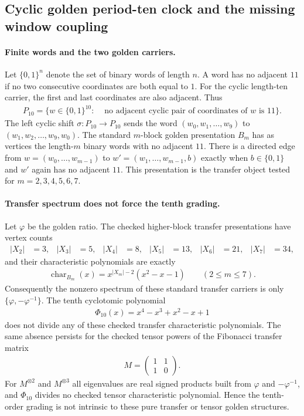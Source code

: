 
\subsection{Cyclic golden period-ten clock and the missing window coupling}
\label{sec:window6-cyclic-golden-10-clock-phi10-forward-coupling-needs-external}

\paragraph{Finite words and the two golden carriers.}
Let $\{0,1\}^n$ denote the set of binary words of length $n$. A word has no adjacent $11$ if no two consecutive coordinates are both equal to $1$. For the cyclic length-ten carrier, the first and last coordinates are also adjacent. Thus
$$
\begin{aligned}
P_{10}=\{w\in \{0,1\}^{10}:&\text{ no adjacent cyclic pair of coordinates of }w\text{ is }11\}.
\end{aligned}
$$
The left cyclic shift $\sigma:P_{10}\to P_{10}$ sends the word $(w_0,w_1,\ldots,w_9)$ to $(w_1,w_2,\ldots,w_9,w_0)$. The standard $m$-block golden presentation $B_m$ has as vertices the length-$m$ binary words with no adjacent $11$. There is a directed edge from $w=(w_0,\ldots,w_{m-1})$ to $w'=(w_1,\ldots,w_{m-1},b)$ exactly when $b\in\{0,1\}$ and $w'$ again has no adjacent $11$. This presentation is the transfer object tested for $m=2,3,4,5,6,7$.

\paragraph{Transfer spectrum does not force the tenth grading.}
Let $\varphi$ be the golden ratio. The checked higher-block transfer presentations have vertex counts
$$
\begin{aligned}
|X_2|&=3,& |X_3|&=5,& |X_4|&=8,& |X_5|&=13,& |X_6|&=21,& |X_7|&=34,
\end{aligned}
$$
and their characteristic polynomials are exactly
$$
\begin{aligned}
\operatorname{char}_{B_m}(x)=x^{|X_m|-2}(x^2-x-1)\qquad (2\leq m\leq 7).
\end{aligned}
$$
Consequently the nonzero spectrum of these standard transfer carriers is only $\{\varphi,-\varphi^{-1}\}$. The tenth cyclotomic polynomial
$$
\begin{aligned}
\Phi_{10}(x)=x^4-x^3+x^2-x+1
\end{aligned}
$$
does not divide any of these checked transfer characteristic polynomials. The same absence persists for the checked tensor powers of the Fibonacci transfer matrix
$$
\begin{aligned}
M=\begin{pmatrix}1&1\\1&0\end{pmatrix}.
\end{aligned}
$$
For $M^{\otimes 2}$ and $M^{\otimes 3}$ all eigenvalues are real signed products built from $\varphi$ and $-\varphi^{-1}$, and $\Phi_{10}$ divides no checked tensor characteristic polynomial. Hence the tenth-order grading is not intrinsic to these pure transfer or tensor golden structures.

